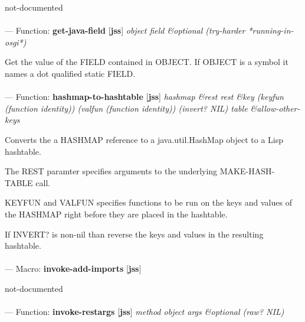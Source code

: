 \begin{adjustwidth}{5em}{5em}
not-documented
\end{adjustwidth}

\paragraph{}
\label{JSS:GET-JAVA-FIELD}
--- Function: \textbf{get-java-field} [\textbf{jss}] \textit{object field \&optional (try-harder *running-in-osgi*)}

\begin{adjustwidth}{5em}{5em}
Get the value of the FIELD contained in OBJECT.
If OBJECT is a symbol it names a dot qualified static FIELD.
\end{adjustwidth}

\paragraph{}
\label{JSS:HASHMAP-TO-HASHTABLE}
--- Function: \textbf{hashmap-to-hashtable} [\textbf{jss}] \textit{hashmap \&rest rest \&key (keyfun (function identity)) (valfun (function identity)) (invert? NIL) table \&allow-other-keys}

\begin{adjustwidth}{5em}{5em}
Converts the a HASHMAP reference to a java.util.HashMap object to a Lisp hashtable.

The REST paramter specifies arguments to the underlying MAKE-HASH-TABLE call.

KEYFUN and VALFUN specifies functions to be run on the keys and values
of the HASHMAP right before they are placed in the hashtable.

If INVERT? is non-nil than reverse the keys and values in the resulting hashtable.
\end{adjustwidth}

\paragraph{}
\label{JSS:INVOKE-ADD-IMPORTS}
--- Macro: \textbf{invoke-add-imports} [\textbf{jss}] \textit{}

\begin{adjustwidth}{5em}{5em}
not-documented
\end{adjustwidth}

\paragraph{}
\label{JSS:INVOKE-RESTARGS}
--- Function: \textbf{invoke-restargs} [\textbf{jss}] \textit{method object args \&optional (raw? NIL)}

